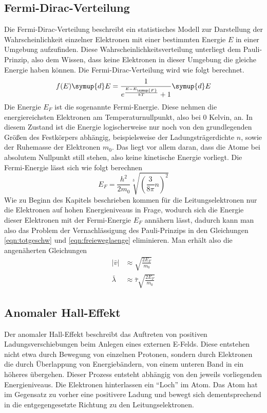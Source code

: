 \subsection{Fermi-Dirac-Verteilung}
\label{sec:fermidirac}
Die Fermi-Dirac-Verteilung beschreibt ein statistisches Modell zur Darstellung der Wahrscheinlichkeit einzelner Elektronen mit einer bestimmten Energie $E$
in einer Umgebung aufzufinden. Diese Wahrscheinlichkeitsverteilung unterliegt dem Pauli-Prinzip, also dem Wissen, dass keine Elektronen in dieser Umgebung die gleiche Energie haben können.
Die Fermi-Dirac-Verteilung wird wie folgt berechnet.
\begin{equation}
\label{eqn:fermidiraceq}
f(E)\symup{d}E = \frac{1}{e^{\frac{E-E_{\symup{F}}}{kT}}+1} \symup{d}E
\end{equation}
Die Energie $E_{F}$ ist die sogenannte Fermi-Energie. Diese nehmen die energiereichsten Elektronen am Temperaturnullpunkt, also bei 0 Kelvin, an. 
In diesem Zustand ist die Energie logischerweise nur noch von den grundlegenden Größen des Festkörpers abhängig, beispielsweise der Ladungsträgerdichte $n$, sowie der Ruhemasse der Elektronen $m_{0}$.
Das liegt vor allem daran, dass die Atome bei absolutem Nullpunkt still stehen, also keine kinetische Energie vorliegt.
Die Fermi-Energie lässt sich wie folgt berechnen
\begin{equation}
\label{eqn:fermienergie}
E_{F} = \frac{h^{2}}{2 m_{0}} \sqrt[3]{\left( \frac{3}{8\pi} n \right)^{2}}
\end{equation}
Wie zu Beginn des Kapitels beschrieben kommen für die Leitungselektronen nur die Elektronen auf hohen Energieniveaus in Frage, wodurch sich die Energie dieser Elektronen
mit der Fermi-Energie $E_{F}$ annähern lässt, dadurch kann man also das Problem der Vernachlässigung des Pauli-Prinzips in den Gleichungen \eqref{eqn:totgeschw} und \eqref{eqn:freieweglaenge} eliminieren.
Man erhält also die angenäherten Gleichungen
\begin{align}
\lvert \bar{v} \rvert &\approx \sqrt{\frac{2 E_{F}}{m_{0}}} \\
\bar{\lambda} &\approx \bar{\tau} \sqrt{\frac{2 E_{F}}{m_{0}}}
\end{align}

\subsection{Anomaler Hall-Effekt}
\label{sec:anomhall}
Der anomaler Hall-Effekt beschreibt das Auftreten von positiven Ladungsverschiebungen beim Anlegen eines externen E-Felds. Diese entstehen nicht etwa durch Bewegung von einzelnen Protonen, sondern durch Elektronen
die durch Überlappung von Energiebändern, von einem unteren Band in ein höheres übergehen. Dieser Prozess entsteht abhängig von den jeweils vorliegenden Energieniveaus.
Die Elektronen hinterlassen ein \enquote{Loch} im Atom. Das Atom hat im Gegensatz zu vorher eine positivere Ladung und bewegt sich dementsprechend in die entgegengesetzte Richtung zu den Leitungselektronen.
